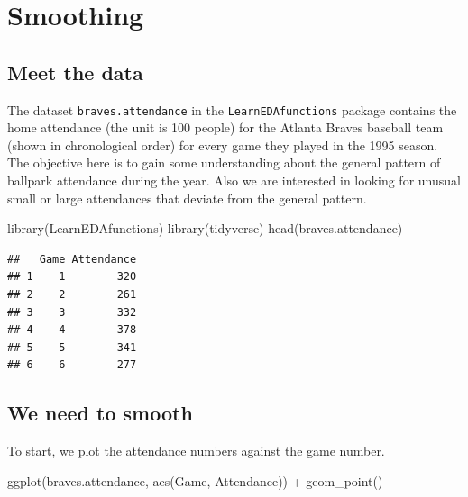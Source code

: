 \documentclass[
]{book}
\newenvironment{Shaded}{\begin{snugshade}}{\end{snugshade}}
\newcommand{\FunctionTok}[1]{\textcolor[rgb]{0.00,0.00,0.00}{#1}}
\newcommand{\NormalTok}[1]{#1}
\newcommand{\SpecialCharTok}[1]{\textcolor[rgb]{0.00,0.00,0.00}{#1}}
\begin{document}
\hypertarget{smoothing}{%
\chapter{Smoothing}\label{smoothing}}

\hypertarget{meet-the-data-5}{%
\section{Meet the data}\label{meet-the-data-5}}

The dataset \texttt{braves.attendance} in the \texttt{LearnEDAfunctions} package contains the home attendance (the unit is 100 people) for the Atlanta Braves baseball team (shown in chronological order) for every game they played in the 1995 season. The objective here is to gain some understanding about the general pattern of ballpark attendance during the year. Also we are interested in looking for unusual small or large attendances that deviate from the general pattern.

\begin{Shaded}
\begin{Highlighting}[]
\FunctionTok{library}\NormalTok{(LearnEDAfunctions)}
\FunctionTok{library}\NormalTok{(tidyverse)}
\FunctionTok{head}\NormalTok{(braves.attendance)}
\end{Highlighting}
\end{Shaded}

\begin{verbatim}
##   Game Attendance
## 1    1        320
## 2    2        261
## 3    3        332
## 4    4        378
## 5    5        341
## 6    6        277
\end{verbatim}

\hypertarget{we-need-to-smooth}{%
\section{We need to smooth}\label{we-need-to-smooth}}

To start, we plot the attendance numbers against the game number.

\begin{Shaded}
\begin{Highlighting}[]
\FunctionTok{ggplot}\NormalTok{(braves.attendance,}
       \FunctionTok{aes}\NormalTok{(Game, Attendance)) }\SpecialCharTok{+}
  \FunctionTok{geom\_point}\NormalTok{()}
\end{Highlighting}
\end{Shaded}
\end{document}
